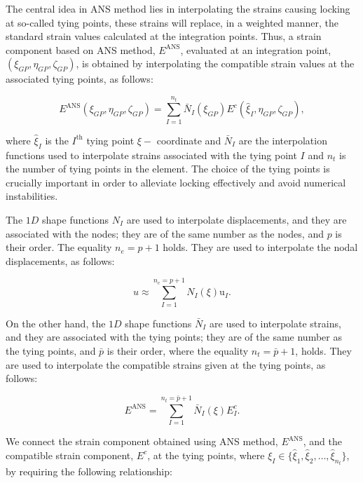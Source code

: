 \documentclass[12pt]{article}
\begin{document}
The central idea in ANS method lies in interpolating the strains causing locking at so-called tying points, these strains will replace, in a weighted manner, the standard strain values calculated at the integration points. Thus, a strain component based on ANS method, $E^{\text{ANS}}$, evaluated at an integration point, $(\xi_{GP}, \eta_{GP}, \zeta_{GP})$, is obtained by interpolating the compatible strain values at the associated tying points, as follows:

\begin{equation}
E^{\text{ANS}} (\xi_{GP}, \eta_{GP}, \zeta_{GP}) = \sum_{I=1}^{n_t} \bar{N}_I (\xi_{GP}) E^{c} (\hat{\xi}_I, \eta_{GP}, \zeta_{GP}),
\end{equation}

\noindent
where $\hat{\xi}_I$ is the $I^{\text{th}}$ tying point $\xi-$ coordinate and $\bar{N}_I$ are the interpolation functions used to interpolate strains associated with the tying point $I$ and $n_t$ is the number of tying points in the element. The choice of the tying points is crucially important in order to alleviate locking effectively and avoid numerical instabilities.

The $1D$ shape functions $N_I$ are used to interpolate displacements, and they are associated with the nodes; they are of the same number as the nodes, and $p$ is their order. The equality $n_e = p+1$ holds. They are used to interpolate the nodal displacements, as follows:

\begin{equation}
u \approx \sum_{I=1}^{n_e = p+1} N_I (\xi) \text{u}_I.
\end{equation}

On the other hand, the $1D$ shape functions $\bar{N}_I$ are used to interpolate strains, and they are associated with the tying points; they are of the same number as the tying points, and $\bar{p}$ is their order, where the equality $n_t = \bar{p} + 1$, holds. They are used to interpolate the compatible strains given at the tying points, as follows:

\begin{equation}
E^{\text{ANS}} = \sum_{I=1}^{n_t = \bar{p}+1} \bar{N}_I (\xi) E^c_I.
\end{equation}


We connect the strain component obtained using ANS method, $E^{\text{ANS}}$, and the compatible strain component, $E^c$, at the tying points, where $\xi_I \in \{ \hat{\xi}_1, \hat{\xi}_2, \ldots, \hat{\xi}_{n_t} \}$, by requiring the following relationship:
\end{document}
